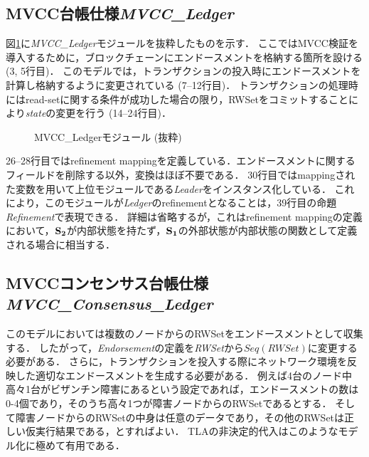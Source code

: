 \documentclass{fose2019}           %
\begin{document}
\subsection{MVCC台帳仕様\textit{MVCC\_Ledger}}
図\ref{fig:mvcc}に\textit{MVCC\_Ledger}モジュールを抜粋したものを示す．
ここではMVCC検証を導入するために，ブロックチェーンにエンドースメントを格納する箇所を設ける (3, 5行目)．
このモデルでは，トランザクションの投入時にエンドースメントを計算し格納するように変更されている (7--12行目)．
トランザクションの処理時にはread-setに関する条件が成功した場合の限り，RWSetをコミットすることにより\textit{state}の変更を行う (14--24行目)．
\begin{figure}[t!pbh]
\centering
\begin{minipage}{0.95\linewidth}

\caption{MVCC\_Ledgerモジュール (抜粋)}\label{fig:mvcc}
\end{minipage}
\end{figure}

26--28行目ではrefinement mappingを定義している．エンドースメントに関するフィールドを削除する以外，変換はほぼ不要である．
30行目ではmappingされた変数を用いて上位モジュールである\textit{Leader}をインスタンス化している．
これにより，このモジュールが\textit{Ledger}のrefinementとなることは，39行目の命題\textit{Refinement}で表現できる．
詳細は省略するが，これはrefinement mappingの定義\cite{refmap}において，$\mathbf{S_{2}}$が内部状態を持たず，$\mathbf{S_{1}}$の外部状態が内部状態の関数として定義される場合に相当する．

\subsection{MVCCコンセンサス台帳仕様\textit{MVCC\_Consensus\_Ledger}}
このモデルにおいては複数のノードからのRWSetをエンドースメントとして収集する．
したがって，\textit{Endorsement}の定義を\textit{RWSet}から$\textit{Seq}(\textit{RWSet})$に変更する必要がある．
さらに，トランザクションを投入する際にネットワーク環境を反映した適切なエンドースメントを生成する必要がある．
例えば4台のノード中高々1台がビザンチン障害にあるという設定であれば，エンドースメントの数は0-4個であり，そのうち高々1つが障害ノードからのRWSetであるとする．
そして障害ノードからのRWSetの中身は任意のデータであり，その他のRWSetは正しい仮実行結果である，とすればよい．
TLAの非決定的代入はこのようなモデル化に極めて有用である．
\end{document}
